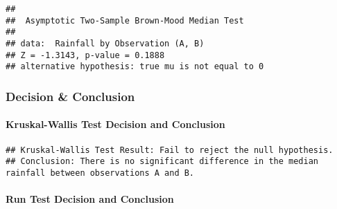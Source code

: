 \documentclass[
]{article}
\newenvironment{Shaded}{\begin{snugshade}}{\end{snugshade}}
\newcommand{\ControlFlowTok}[1]{\textcolor[rgb]{0.13,0.29,0.53}{\textbf{#1}}}
\newcommand{\FloatTok}[1]{\textcolor[rgb]{0.00,0.00,0.81}{#1}}
\newcommand{\FunctionTok}[1]{\textcolor[rgb]{0.00,0.00,0.00}{#1}}
\newcommand{\NormalTok}[1]{#1}
\newcommand{\SpecialCharTok}[1]{\textcolor[rgb]{0.00,0.00,0.00}{#1}}
\newcommand{\StringTok}[1]{\textcolor[rgb]{0.31,0.60,0.02}{#1}}
\begin{document}
\begin{verbatim}
## 
##  Asymptotic Two-Sample Brown-Mood Median Test
## 
## data:  Rainfall by Observation (A, B)
## Z = -1.3143, p-value = 0.1888
## alternative hypothesis: true mu is not equal to 0
\end{verbatim}

\hypertarget{decision-conclusion-5}{%
\subsubsection{Decision \& Conclusion}\label{decision-conclusion-5}}

\hypertarget{kruskal-wallis-test-decision-and-conclusion}{%
\paragraph{Kruskal-Wallis Test Decision and
Conclusion}\label{kruskal-wallis-test-decision-and-conclusion}}

\begin{Shaded}
\end{Shaded}

\begin{verbatim}
## Kruskal-Wallis Test Result: Fail to reject the null hypothesis.
## Conclusion: There is no significant difference in the median rainfall between observations A and B.
\end{verbatim}

\hypertarget{run-test-decision-and-conclusion}{%
\paragraph{Run Test Decision and
Conclusion}\label{run-test-decision-and-conclusion}}
\end{document}
